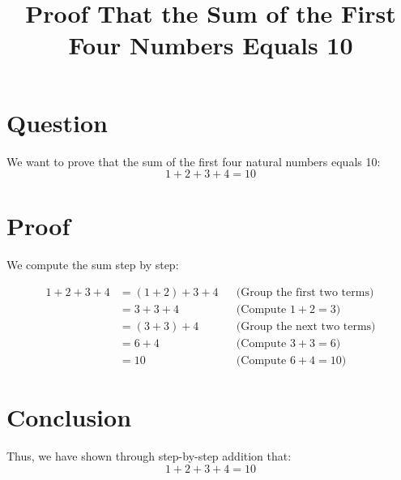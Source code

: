 \documentclass{article}
\begin{document}
\title{Proof That the Sum of the First Four Numbers Equals 10}
\maketitle

\section{Question}
We want to prove that the sum of the first four natural numbers equals 10:
\[ 1 + 2 + 3 + 4 = 10 \]

\section{Proof}
We compute the sum step by step:

\begin{align*}
1 + 2 + 3 + 4 &= (1 + 2) + 3 + 4 && \text{(Group the first two terms)} \\
              &= 3 + 3 + 4         && \text{(Compute } 1 + 2 = 3\text{)} \\
              &= (3 + 3) + 4        && \text{(Group the next two terms)} \\
              &= 6 + 4             && \text{(Compute } 3 + 3 = 6\text{)} \\
              &= 10                && \text{(Compute } 6 + 4 = 10\text{)}
\end{align*}

\section{Conclusion}
Thus, we have shown through step-by-step addition that:
\[ 1 + 2 + 3 + 4 = 10 \]
\end{document}
